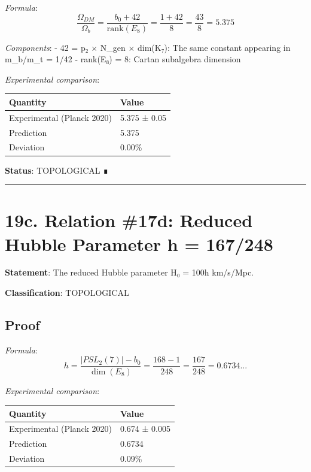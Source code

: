 \documentclass[11pt,a4paper]{article}
\begin{document}
\emph{Formula}: \[\frac{\Omega_{DM}}{\Omega_b} = \frac{b_0 + 42}{\text{rank}(E_8)} = \frac{1 + 42}{8} = \frac{43}{8} = 5.375\]

\emph{Components}: - 42 = p₂ × N\_\allowbreak{}gen × dim(K₇): The same constant appearing in m\_\allowbreak{}b/m\_\allowbreak{}t = 1/42 - rank(E₈) = 8: Cartan subalgebra dimension

\emph{Experimental comparison}:

\begin{longtable}[]{@{}ll@{}}
\toprule\noalign{}
Quantity & Value \\
\midrule\noalign{}
\endhead
\bottomrule\noalign{}
\endlastfoot
Experimental (Planck 2020) & 5.375 ± 0.05 \\
Prediction & 5.375 \\
Deviation & 0.00\% \\
\end{longtable}

\textbf{Status}: TOPOLOGICAL ∎

\begin{center}\rule{\linewidth}{0.5pt}\end{center}

\section{19c. Relation \#17d: Reduced Hubble Parameter h = 167/248}\label{c.-relation-17d-reduced-hubble-parameter-h-167248}

\textbf{Statement}: The reduced Hubble parameter H₀ = 100h km/s/Mpc.

\textbf{Classification}: TOPOLOGICAL

\subsection{Proof}\label{proof-23}

\emph{Formula}: \[h = \frac{|PSL_2(7)| - b_0}{\dim(E_8)} = \frac{168 - 1}{248} = \frac{167}{248} = 0.6734...\]

\emph{Experimental comparison}:

\begin{longtable}[]{@{}ll@{}}
\toprule\noalign{}
Quantity & Value \\
\midrule\noalign{}
\endhead
\bottomrule\noalign{}
\endlastfoot
Experimental (Planck 2020) & 0.674 ± 0.005 \\
Prediction & 0.6734 \\
Deviation & 0.09\% \\
\end{longtable}
\end{document}
